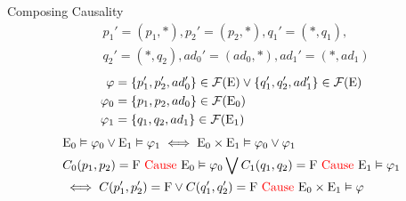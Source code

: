 \begin{frame}{Composing Causality}
    \begin{align*}
         & p_1' = (p_1,*), p_2' = (p_2,*), q_1' = (*,q_1),  \\
         & q_2'=(*,q_2), ad_0' = (ad_0,*), ad_1' = (*,ad_1)
    \end{align*}
    \begin{align*}
        \varphi   & = \{p_1',p_2',ad_0'\} \in \mathcal{F}(\mathrm{E})
        \vee \{q_1',q_2',ad_1'\} \in \mathcal{F}(\mathrm{E})          \\
        \varphi_0 & = \{p_1,p_2,ad_0\} \in \mathcal{F}(\mathrm{E}_0)  \\
        \varphi_1 & = \{q_1,q_2,ad_1\} \in \mathcal{F}(\mathrm{E}_1)
    \end{align*}
    \begin{align*}
         &
        \mathrm{E}_0 \vDash \varphi_0 \vee \mathrm{E}_1 \vDash \varphi_1
        \iff \mathrm{E}_0 \times \mathrm{E}_1 \vDash \varphi_0 \vee \varphi_1                \\
         & C_0(p_1,p_2) = \mathrm{F} \text{ \textcolor{red}{Cause} } \mathrm{E}_0 \vDash \varphi_0
        \bigvee C_1(q_1,q_2) = \mathrm{F} \text{ \textcolor{red}{Cause} } \mathrm{E}_1 \vDash \varphi_1 \\
         & \iff C(p_1',p_2') = \mathrm{F} \vee C(q_1',q_2') = \mathrm{F} \text{ \textcolor{red}{Cause} }
        \mathrm{E}_0 \times \mathrm{E}_1 \vDash \varphi
    \end{align*}
\end{frame}